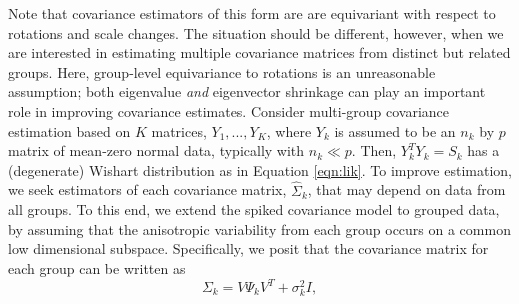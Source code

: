 \documentclass[12pt]{article}
\begin{document}
Note that covariance estimators of this form are are equivariant with
respect to rotations and scale changes.  The situation should be
different, however, when we are interested in estimating multiple
covariance matrices from distinct but related groups.  Here,
group-level equivariance to rotations is an unreasonable assumption;
both eigenvalue \emph{and} eigenvector shrinkage can play an important
role in improving covariance estimates.  Consider multi-group
covariance estimation based on $K$ matrices, $Y_1, ..., Y_K$, where
$Y_k$ is assumed to be an $n_k$ by $p$ matrix of mean-zero normal
data, typically with $n_k \ll p$.  Then, $Y_k^TY_k = S_k$ has a
(degenerate) Wishart distribution as in Equation \ref{eqn:lik}.  To
improve estimation, we seek estimators of each covariance matrix,
$\hat{\Sigma}_k$, that may depend on data from all groups.  To this
end, we extend the spiked covariance model to grouped data, by
assuming that the anisotropic variability from each group occurs on a
common low dimensional subspace.  Specifically, we posit that the
covariance matrix for each group can be written as
\begin{equation}
\Sigma_k = V\Psi_kV^T + \sigma^2_kI,
\label{eqn:sspsi}
\end{equation}



\end{document}
